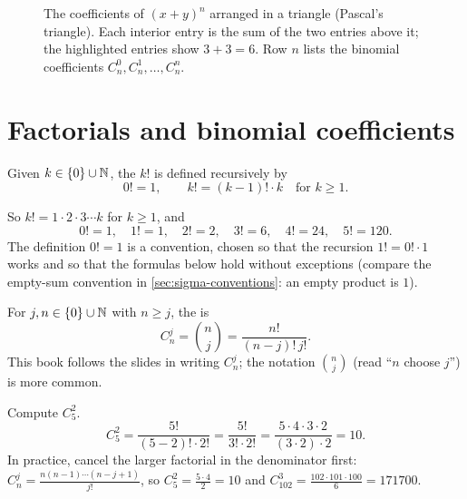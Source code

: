 \begin{figure}[ht]
\centering
{}
\caption{The coefficients of $(x+y)^n$ arranged in a triangle (Pascal's triangle). Each interior entry is the sum of the
two entries above it; the highlighted entries show $3+3=6$. Row $n$ lists the binomial coefficients $C_n^0,C_n^1,\dots,C_n^n$.}
\label{fig:pascal}
\end{figure}

\section{Factorials and binomial coefficients}\label{sec:binom-coeff}

\begin{definition}
Given $k\in\{0\}\cup\mathbb{N}$, the  $k!$ is defined recursively by
\[
0!=1,\qquad k!=(k-1)!\cdot k\quad\text{for }k\ge1.
\]
\end{definition}
So $k!=1\cdot2\cdot3\cdots k$ for $k\ge1$, and
\[
0!=1,\quad1!=1,\quad2!=2,\quad3!=6,\quad4!=24,\quad5!=120.
\]
The definition $0!=1$ is a convention, chosen so that the recursion $1!=0!\cdot1$ works and so that the formulas below hold
without exceptions (compare the empty-sum convention in \cref{sec:sigma-conventions}: an empty product is $1$).

\begin{definition}
For $j,n\in\{0\}\cup\mathbb{N}$ with $n\ge j$, the  is
\[
C_n^j=\binom{n}{j}=\frac{n!}{(n-j)!\,j!}.
\]
This book follows the slides in writing $C_n^j$; the notation $\binom nj$ (read ``$n$ choose $j$'') is more common.
\end{definition}

\begin{example}
Compute $C_5^2$. 
\solution
\[
C_5^2=\frac{5!}{(5-2)!\cdot2!}=\frac{5!}{3!\cdot2!}=\frac{5\cdot4\cdot3\cdot2}{(3\cdot2)\cdot2}=10.
\]
In practice, cancel the larger factorial in the denominator first:
$C_n^j=\frac{n(n-1)\cdots(n-j+1)}{j!}$, so $C_5^2=\frac{5\cdot4}{2}=10$ and $C_{102}^{3}=\frac{102\cdot101\cdot100}{6}=171700$.
\end{example}

